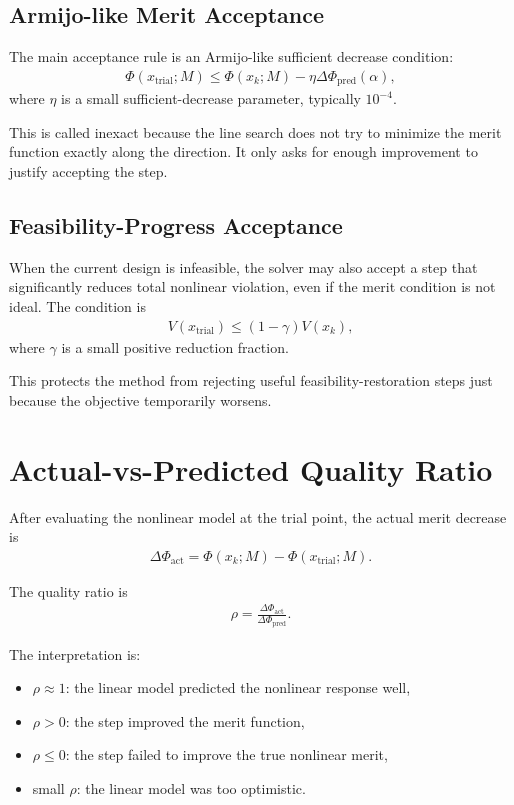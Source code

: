 \documentclass[11pt,a4paper]{article}
\begin{document}
\subsection{Armijo-like Merit Acceptance}

The main acceptance rule is an Armijo-like sufficient decrease condition:
\begin{align}
    \Phi(x_{\text{trial}}; M)
    \leq
    \Phi(x_k; M)
    -
    \eta \Delta \Phi_{\text{pred}}(\alpha),
\end{align}
where \(\eta\) is a small sufficient-decrease parameter, typically \(10^{-4}\).

This is called inexact because the line search does not try to minimize the
merit function exactly along the direction. It only asks for enough improvement
to justify accepting the step.

\subsection{Feasibility-Progress Acceptance}

When the current design is infeasible, the solver may also accept a step that
significantly reduces total nonlinear violation, even if the merit condition is
not ideal. The condition is
\begin{align}
    V(x_{\text{trial}})
    \leq
    (1-\gamma)V(x_k),
\end{align}
where \(\gamma\) is a small positive reduction fraction.

This protects the method from rejecting useful feasibility-restoration steps
just because the objective temporarily worsens.

\section{Actual-vs-Predicted Quality Ratio}

After evaluating the nonlinear model at the trial point, the actual merit
decrease is
\begin{align}
    \Delta \Phi_{\text{act}}
    =
    \Phi(x_k; M) - \Phi(x_{\text{trial}}; M).
\end{align}

The quality ratio is
\begin{align}
    \rho =
    \frac{\Delta \Phi_{\text{act}}}
         {\Delta \Phi_{\text{pred}}}.
\end{align}

The interpretation is:
\begin{itemize}[nosep]
    \item \(\rho \approx 1\): the linear model predicted the nonlinear response well,
    \item \(\rho > 0\): the step improved the merit function,
    \item \(\rho \leq 0\): the step failed to improve the true nonlinear merit,
    \item small \(\rho\): the linear model was too optimistic.
\end{itemize}
\end{document}
